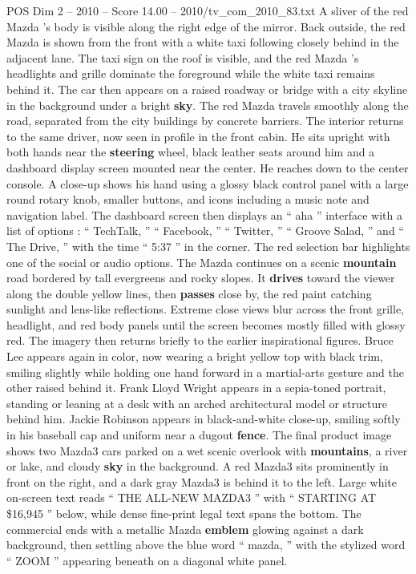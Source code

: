 \begin{textsample}{POS Dim 2 – 2010 – Score 14.00 – 2010/tv\_com\_2010\_83.txt}
A sliver of the red Mazda ’s body is visible along the right edge of the mirror.
Back outside, the red Mazda is shown from the front with a white taxi following closely behind in the adjacent lane.
The taxi sign on the roof is visible, and the red Mazda ’s headlights and grille dominate the foreground while the white taxi remains behind it.
The car then appears on a raised roadway or bridge with a city skyline in the background under a bright \textbf{sky}.
The red Mazda travels smoothly along the road, separated from the city buildings by concrete barriers.
The interior returns to the same driver, now seen in profile in the front cabin.
He sits upright with both hands near the \textbf{steering} wheel, black leather seats around him and a dashboard display screen mounted near the center.
He reaches down to the center console.
A close-up shows his hand using a glossy black control panel with a large round rotary knob, smaller buttons, and icons including a music note and navigation label.
The dashboard screen then displays an “ aha ” interface with a list of options : “ TechTalk, ” “ Facebook, ” “ Twitter, ” “ Groove Salad, ” and “ The Drive, ” with the time “ 5:37 ” in the corner.
The red selection bar highlights one of the social or audio options.
The Mazda continues on a scenic \textbf{mountain} road bordered by tall evergreens and rocky slopes.
It \textbf{drives} toward the viewer along the double yellow lines, then \textbf{passes} close by, the red paint catching sunlight and lens-like reflections.
Extreme close views blur across the front grille, headlight, and red body panels until the screen becomes mostly filled with glossy red.
The imagery then returns briefly to the earlier inspirational figures.
Bruce Lee appears again in color, now wearing a bright yellow top with black trim, smiling slightly while holding one hand forward in a martial-arts gesture and the other raised behind it.
Frank Lloyd Wright appears in a sepia-toned portrait, standing or leaning at a desk with an arched architectural model or structure behind him.
Jackie Robinson appears in black-and-white close-up, smiling softly in his baseball cap and uniform near a dugout \textbf{fence}.
The final product image shows two Mazda3 cars parked on a wet scenic overlook with \textbf{mountains}, a river or lake, and cloudy \textbf{sky} in the background.
A red Mazda3 sits prominently in front on the right, and a dark gray Mazda3 is behind it to the left.
Large white on-screen text reads “ THE ALL-NEW MAZDA3 ” with “ STARTING AT \$16,945 ” below, while dense fine-print legal text spans the bottom.
The commercial ends with a metallic Mazda \textbf{emblem} glowing against a dark background, then settling above the blue word “ mazda, ” with the stylized word “ ZOOM ” appearing beneath on a diagonal white panel.

\end{textsample}
